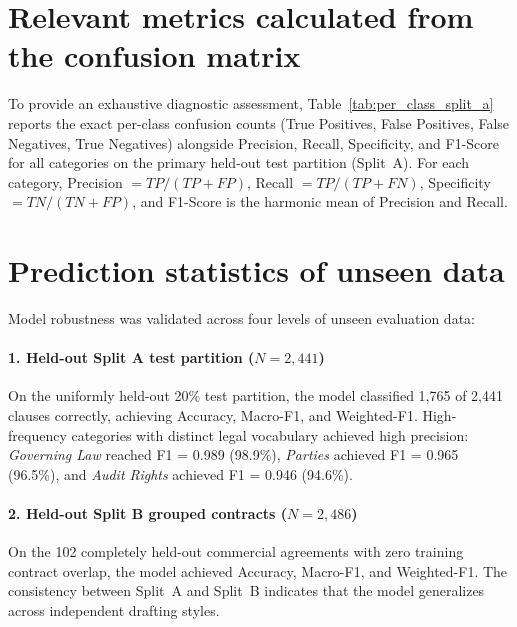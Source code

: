 \section{Relevant metrics calculated from the confusion matrix}
\label{sec:metrics_from_cm}

To provide an exhaustive diagnostic assessment, Table~\ref{tab:per_class_split_a} reports the exact per-class confusion counts (True Positives, False Positives, False Negatives, True Negatives) alongside Precision, Recall, Specificity, and F1-Score for all \NumClasses{} categories on the primary held-out test partition (Split~A). For each category, Precision $= TP/(TP+FP)$, Recall $= TP/(TP+FN)$, Specificity $= TN/(TN+FP)$, and F1-Score is the harmonic mean of Precision and Recall.



\section{Prediction statistics of unseen data}
\label{sec:unseen_data}

Model robustness was validated across four levels of unseen evaluation data:

\paragraph*{1. Held-out Split A test partition ($N = 2,441$)}
On the uniformly held-out 20\% test partition, the model classified 1,765 of 2,441 clauses correctly, achieving \FinalSplitAAcc{} Accuracy, \FinalSplitAMacroFScore{} Macro-F1, and \FinalSplitAWeightedFScore{} Weighted-F1. High-frequency categories with distinct legal vocabulary achieved high precision: \textit{Governing Law} reached F1 = 0.989 (98.9\%), \textit{Parties} achieved F1 = 0.965 (96.5\%), and \textit{Audit Rights} achieved F1 = 0.946 (94.6\%).

\paragraph*{2. Held-out Split B grouped contracts ($N = 2,486$)}
On the 102 completely held-out commercial agreements with zero training contract overlap, the model achieved \FinalSplitBAcc{} Accuracy, \FinalSplitBMacroFScore{} Macro-F1, and \FinalSplitBWeightedFScore{} Weighted-F1. The consistency between Split~A and Split~B indicates that the model generalizes across independent drafting styles.


